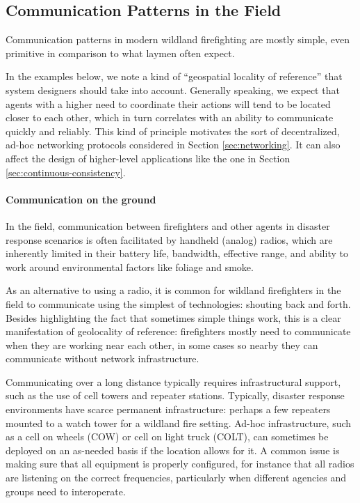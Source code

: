 \documentclass[]             %
{NASA}                       %
\theoremstyle{definition}
\begin{document}
\subsection{Communication Patterns in the Field}
\label{communication-in-practice}

Communication patterns in modern wildland firefighting are mostly
simple, even primitive in comparison to what laymen often expect.

In the examples below, we note a kind of ``geospatial locality of
reference'' that system designers should take into account. Generally
speaking, we expect that agents with a higher need to coordinate their
actions will tend to be located closer to each other, which in turn
correlates with an ability to communicate quickly and reliably. This
kind of principle motivates the sort of decentralized, ad-hoc networking
protocols considered in Section \ref{sec:networking}. It can also affect
the design of higher-level applications like the one in Section
\ref{sec:continuous-consistency}.

\paragraph{Communication on the ground}

In the field, communication between firefighters and other agents in
disaster response scenarios is often facilitated by handheld (analog)
radios, which are inherently limited in their battery life, bandwidth,
effective range, and ability to work around environmental factors like
foliage and smoke.

As an alternative to using a radio, it is common for wildland
firefighters in the field to communicate using the simplest of
technologies: shouting back and forth. Besides highlighting the fact
that sometimes simple things work, this is a clear manifestation of
geolocality of reference: firefighters mostly need to communicate when
they are working near each other, in some cases so nearby they can
communicate without network infrastructure.

Communicating over a long distance typically requires infrastructural
support, such as the use of cell towers and repeater
stations. Typically, disaster response environments have scarce
permanent infrastructure: perhaps a few repeaters mounted to a watch
tower for a wildland fire setting. Ad-hoc infrastructure, such as a
cell on wheels (COW) or cell on light truck (COLT), can sometimes be
deployed on an as-needed basis if the location allows for it. A common
issue is making sure that all equipment is properly configured, for
instance that all radios are listening on the correct frequencies,
particularly when different agencies and groups need to interoperate.
\end{document}
